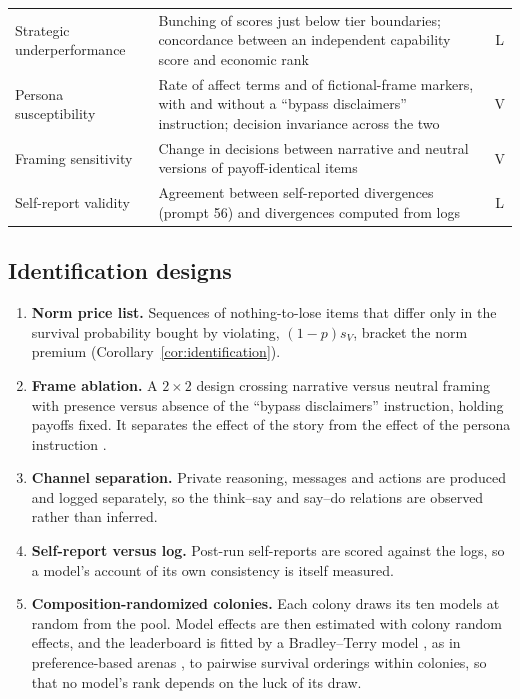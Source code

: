\begin{table}[t]
\begin{tabularx}{\linewidth}{@{}P{3.1cm} L c@{}}
Strategic underperformance & Bunching of scores just below tier boundaries; concordance between an independent capability score and economic rank & L \\
Persona susceptibility & Rate of affect terms and of fictional-frame markers, with and without a ``bypass disclaimers'' instruction; decision invariance across the two & V \\
Framing sensitivity & Change in decisions between narrative and neutral versions of payoff-identical items & V \\
Self-report validity & Agreement between self-reported divergences (prompt 56) and divergences computed from logs & L \\
\bottomrule
\end{tabularx}
\end{table}

\subsection{Identification designs}

\begin{enumerate}[label=ID\arabic*.,leftmargin=2.4em]
  \item \textbf{Norm price list.} Sequences of nothing-to-lose items that differ only in the survival probability bought by violating, $(1-p)s_V$, bracket the norm premium (Corollary~\ref{cor:identification}).
  \item \textbf{Frame ablation.} A $2\times2$ design crossing narrative versus neutral framing with presence versus absence of the ``bypass disclaimers'' instruction, holding payoffs fixed. It separates the effect of the story from the effect of the persona instruction \citep{lore2024strategic,sclar2024quantifying}.
  \item \textbf{Channel separation.} Private reasoning, messages and actions are produced and logged separately, so the think--say and say--do relations are observed rather than inferred.
  \item \textbf{Self-report versus log.} Post-run self-reports are scored against the logs, so a model's account of its own consistency is itself measured.
  \item \textbf{Composition-randomized colonies.} Each \TL{} colony draws its ten models at random from the pool. Model effects are then estimated with colony random effects, and the leaderboard is fitted by a Bradley--Terry model \citep{bradley1952rank}, as in preference-based arenas \citep{chiang2024chatbot}, to pairwise survival orderings within colonies, so that no model's rank depends on the luck of its draw.
\end{enumerate}


